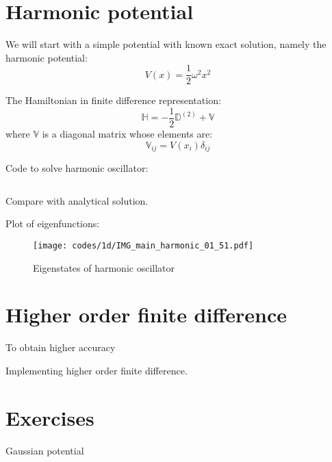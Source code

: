 \section{Harmonic potential}

We will start with a simple potential with known exact solution, namely the harmonic potential:
\begin{equation}
V(x) = \frac{1}{2}\omega^2 x^2
\end{equation}

The Hamiltonian in finite difference representation:
\begin{equation}
\mathbb{H} = -\frac{1}{2}\mathbb{D}^{(2)} + \mathbb{V}
\end{equation}
where $\mathbb{V}$ is a diagonal matrix whose elements are:
\begin{equation}
\mathbb{V}_{ij} = V(x_{i})\delta_{ij}
\end{equation}


Code to solve harmonic oscillator:

\inputminted[breaklines]{julia}{codes/1d/main_harmonic_01.jl}

Compare with analytical solution.

Plot of eigenfunctions:

\begin{figure}[H]
{\center
\texttt{[image: codes/1d/IMG\_main\_harmonic\_01\_51.pdf]}
\par}
\caption{Eigenstates of harmonic oscillator}
\end{figure}


\section{Higher order finite difference}

To obtain higher accuracy

Implementing higher order finite difference.


\section{Exercises}

Gaussian potential


